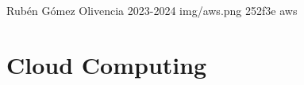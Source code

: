 \documentclass{\ClassPath/yukibook}
\begin{document}
    {Rubén Gómez Olivencia}  %
    {2023-2024}    %
    {} %
    {} %
    {} %
    {img/aws.png} %
    {252f3e}
    {aws} %

    \coverpage
    \graphicspath{{../../yukibook.cls/}}
    \licensepage

    \tableofcontents

    \graphicspath{{img/aws/}}

    \part{Cloud Computing}
    
\end{document}
